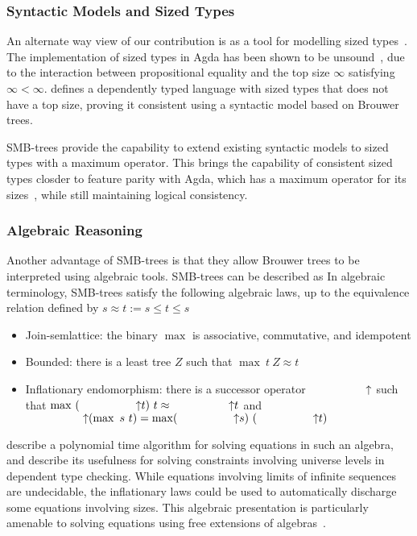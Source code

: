 \subsubsection{Syntactic Models and Sized Types}

An alternate way view of our contribution is as a tool for modelling sized types~\citep{TODO}.
The implementation of sized types in Agda has been shown to be unsound~\citep{TODO}, due to the interaction
between propositional equality and the top size $\infty$ satisfying $\infty < \infty$.
 defines a dependently typed language with sized types that does not have a top size, proving it consistent
using a syntactic model based on Brouwer trees.

SMB-trees provide the capability to extend existing syntactic models to sized types
with a maximum operator.
This brings the capability of consistent sized types closder to feature parity with Agda,
which has a maximum operator for its sizes~\citep{TODO}, while still maintaining logical consistency.

\subsubsection{Algebraic Reasoning}
Another advantage of SMB-trees is that they allow Brouwer trees to
be interpreted using algebraic tools.
SMB-trees can be described as
In algebraic terminology, SMB-trees satisfy the following algebraic laws, up to the equivalence relation defined by $s \approx t := s \le t \le s $
\begin{itemize}
  \item Join-semlattice: the binary $\max$ is associative, commutative, and idempotent
  \item Bounded: there is a least tree $Z$ such that $\max\ t\ Z \approx t$
  \item Inflationary endomorphism: there is a successor operator $\up$
        such that ${\max\ (\up t)\ t \approx \up t}$
        and\\ ${\up (\max\ s\ t) = \max (\up s)\ (\up t)}$
\end{itemize}

 describe a polynomial time algorithm for solving equations in such an algebra,
and describe its usefulness for solving constraints involving universe levels
in dependent type checking. While equations involving limits of infinite sequences
are undecidable, the inflationary laws could be used to automatically discharge some equations involving sizes. This algebraic presentation is particularly
amenable to solving equations using free extensions of algebras~\citep{corbyn:proof-synthesis,allais2023frex}.

